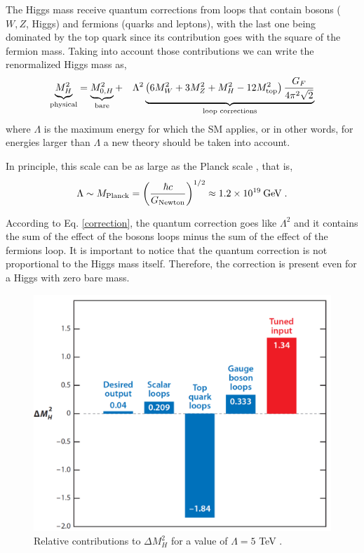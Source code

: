 The Higgs mass receive quantum corrections from loops that contain bosons ($W,Z$, Higgs) and fermions (quarks and leptons), with the last one being dominated by the top quark since its contribution goes with the square of the fermion mass. Taking into account those contributions we can write the renormalized Higgs mass as, \cite{Quigg:2009vq}
\begin{equation}
\underbrace{M_H^2}_{\rm physical} = \underbrace{M_{0,H}^2}_{\rm bare}  + \quad\Lambda^2\underbrace{\left( 6M_W^2 + 3M_Z^2 + M_H^2 - 12 M_{\rm top}^2\right) \frac{G_F}{4\pi^2\sqrt{2}}}_{\text{loop corrections}}  
\label{correction}
\end{equation}
where $\Lambda$ is the maximum energy for which the SM applies, or in other words, for energies larger than $\Lambda$ a new theory should be taken into account. 

In principle, this scale can be as large as the Planck scale , that is,
\begin{equation*}
\Lambda\sim M_{\rm Planck} = \left(\frac{\hbar c}{G_{\rm Newton}}\right)^{1/2} \approx 1.2\times 10^{19}\:{\rm GeV} \; .
\end{equation*}

According to Eq. \ref{correction}, the quantum correction goes like $\Lambda^2$ and it contains the sum of the effect of the bosons loops minus the sum of the effect of the fermions loop. It is important to notice that the quantum correction is not proportional to the Higgs mass itself. Therefore, the correction is present even for a Higgs with zero bare mass. 

\begin{figure}[h]
\centering
\includegraphics[scale=0.23]{figures/theory/deltaMass.pdf}
\caption[Relative contributions to $\Delta M_{H}^2$]{Relative contributions to $\Delta M_{H}^2$ for a value of $\Lambda=5$ TeV \cite{Quigg:2009vq}.}
\label{deltaMass}
\end{figure}

